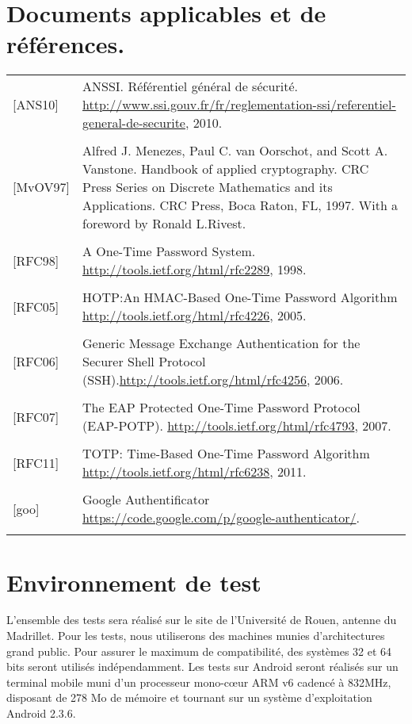 \documentclass{"../../res/univ-projet"}
\begin{document}
  \section{Documents applicables et de références.}
  \begin{tabular}{p{}>{\raggedright\arraybackslash}p{13cm}}
    {[ANS10]} & {ANSSI. Référentiel général de sécurité. \href{http://www.ssi.gouv.fr/fr/reglementation-ssi/referentiel-general-de-securite}{http://www.ssi.gouv.fr/fr/reglementation-ssi/referentiel-general-de-securite}, 2010.}
    \tabularnewline
    \\
    {[MvOV97]} & {Alfred J. Menezes, Paul C. van Oorschot, and Scott A. Vanstone. Handbook of applied cryptography. CRC Press Series on Discrete Mathematics and its Applications. CRC Press, Boca Raton, FL, 1997. With a foreword by Ronald L.Rivest.}
    \tabularnewline
    \\
    {[RFC98]} & {A One-Time Password System. \href{http://tools.ietf.org/html/rfc2289}{http://tools.ietf.org/html/rfc2289}, 1998.}
    \tabularnewline
    \\
    {[RFC05]} & {HOTP:An HMAC-Based One-Time Password Algorithm \href{http://tools.ietf.org/html/rfc4226}{http://tools.ietf.org/html/rfc4226}, 2005.}
    \tabularnewline
    \\
    {[RFC06]} & {Generic Message Exchange Authentication for the Securer Shell Protocol (SSH).\href{http://tools.ietf.org/html/rfc4256}{http://tools.ietf.org/html/rfc4256}, 2006.}
    \tabularnewline
    \\
    {[RFC07]} & {The EAP Protected One-Time Password Protocol (EAP-POTP). \href{http://tools.ietf.org/html/rfc4793}{http://tools.ietf.org/html/rfc4793}, 2007.}
    \tabularnewline
    \\
    {[RFC11]} & {TOTP: Time-Based One-Time Password Algorithm \href{http://tools.ietf.org/html/rfc6238}{http://tools.ietf.org/html/rfc6238}, 2011.}
    \tabularnewline
    \\
    {[goo]} & {Google Authentificator \href{https://code.google.com/p/google-authenticator/}{https://code.google.com/p/google-authenticator/}.}
    \tabularnewline
    \\
  \end{tabular}
  
  \section{Environnement de test}
  L'ensemble des tests sera réalisé sur le site de l'Université de Rouen, antenne du Madrillet.
  Pour les tests, nous utiliserons des machines munies d'architectures grand public. Pour assurer le maximum de compatibilité, des systèmes 32 et 64 bits seront utilisés 
  indépendamment. Les tests sur Android seront réalisés sur un terminal mobile muni d'un processeur mono-cœur ARM v6 cadencé à 832MHz, disposant de 278 Mo de mémoire et tournant sur un 
  système d'exploitation Android 2.3.6.
  
\end{document}
